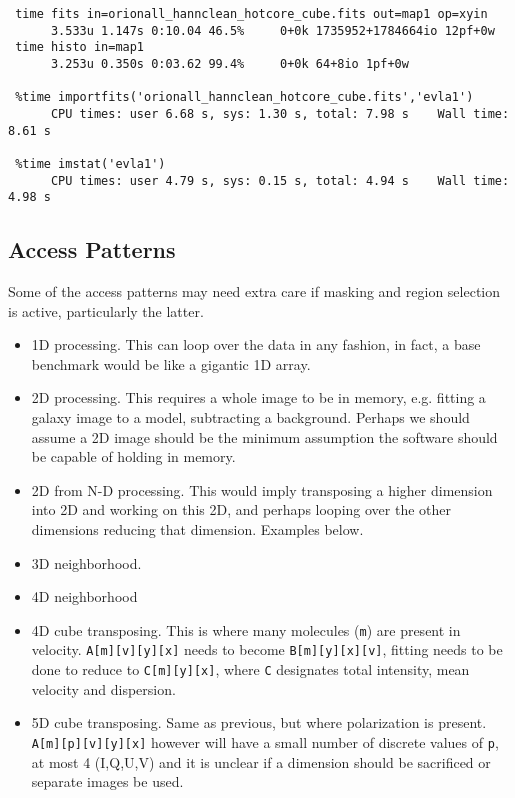 \documentclass[preprint]{aastex} %
\begin{document}
\begin{verbatim}
 time fits in=orionall_hannclean_hotcore_cube.fits out=map1 op=xyin
      3.533u 1.147s 0:10.04 46.5%     0+0k 1735952+1784664io 12pf+0w
 time histo in=map1
      3.253u 0.350s 0:03.62 99.4%     0+0k 64+8io 1pf+0w

 %time importfits('orionall_hannclean_hotcore_cube.fits','evla1')
      CPU times: user 6.68 s, sys: 1.30 s, total: 7.98 s    Wall time: 8.61 s

 %time imstat('evla1')
      CPU times: user 4.79 s, sys: 0.15 s, total: 4.94 s    Wall time: 4.98 s
\end{verbatim}

\subsection{Access Patterns}

Some of the access patterns may need extra care if masking and region
selection is active, particularly the latter.

\begin{itemize}

\item 1D processing. This can loop over the data in any fashion,
in fact, a base benchmark would be like a gigantic 1D array.

\item 2D processing. This requires a whole image to be in memory,
e.g. fitting a galaxy image to a model, subtracting a background. 
Perhaps we should assume a 2D image should be the minimum 
assumption the software should be capable of holding in memory.

\item 2D from N-D processing. This would imply transposing a higher
dimension into 2D and working on this 2D, and perhaps looping over
the other dimensions reducing that dimension. Examples  below.

\item 3D neighborhood. 

\item 4D neighborhood

\item 4D cube transposing. This is where many molecules ({\tt m}) are
present in velocity.
{\tt A[m][v][y][x]} needs to become
{\tt B[m][y][x][v]}, fitting needs to be done to reduce to
{\tt C[m][y][x]}, where {\tt C} designates total intensity, mean velocity
and dispersion.


\item 5D cube transposing. Same as previous, but where polarization is
present. {\tt A[m][p][v][y][x]} however will have a small number of
discrete values of {\tt p}, at most 4 (I,Q,U,V) and it is unclear if
a dimension  should be sacrificed or separate images be used.

\end{itemize}
\end{document}
